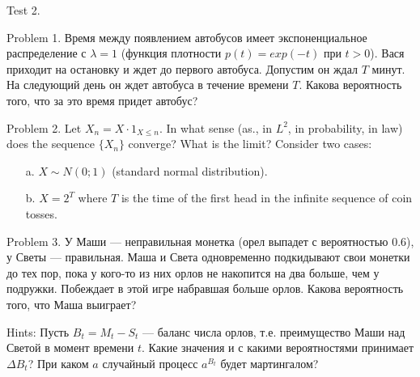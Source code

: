 \documentclass[pdftex,12pt,a4paper]{article}
\begin{document}



Test 2.

Problem 1. Время между появлением автобусов имеет экспоненциальное распределение с $ \lambda=1 $ (функция плотности $ p(t)=exp(-t) $ при $ t>0 $). Вася приходит на остановку и ждет до первого автобуса. Допустим он ждал $ T $ минут. На следующий день он ждет автобуса в течение времени $ T $. Какова вероятность того, что за это время придет автобус?



Problem 2. Let $X_{n}=X\cdot 1_{X\leq n}$. In what sense (as., in $L^{2}$, in probability, in law) does the sequence $ \{X_{n}\} $ converge? What is the limit? Consider two cases:
\begin{itemize}
\item[a.] $ X\sim N(0;1) $ (standard normal distribution).
\item[b.] $ X =2^{T}$ where $T$ is the time of the first head in the infinite sequence of coin tosses.
\end{itemize}

Problem 3. У Маши --- неправильная монетка (орел выпадет с вероятностью 0.6), у Светы --- правильная. Маша и Света одновременно подкидывают свои монетки до тех пор, пока у кого-то из них орлов не накопится на два больше, чем у подружки. Побеждает в этой игре набравшая больше орлов. Какова вероятность того, что Маша выиграет?

Hints: Пусть $B_{t}=M_{t}-S_{t}$ --- баланс числа орлов, т.е. преимущество Маши над Светой в момент времени $t$. Какие значения и с какими вероятностями принимает $ \Delta B_{t} $? При каком $ a $ случайный процесс $ a^{B_{t}} $ будет мартингалом?





\printindex %
\end{document}
